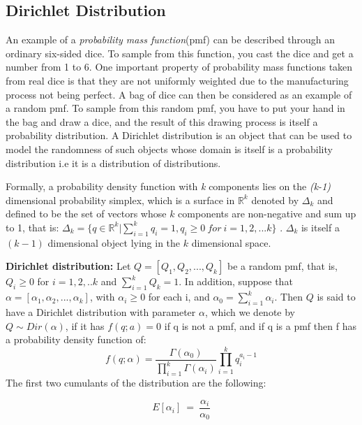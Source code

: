 \documentclass[twoside,hidelinks]{article}
\begin{document}
\subsection{Dirichlet Distribution}

An example of a \textit{probability mass function}(pmf) can be described through an ordinary six-sided dice. To sample from this function, you cast the dice and get a number from 1 to 6. One important property of probability mass functions taken from real dice is that they are not uniformly weighted due to the manufacturing process not being perfect. A bag of dice can then be considered as an example of a random pmf. To sample from this random pmf, you have to put your hand in the bag and draw a dice, and the result of this drawing process is itself a probability distribution. A Dirichlet distribution is an object that can be used to model the randomness of such objects whose domain is itself is a probability distribution i.e it is a distribution of distributions.

Formally, a probability density function with \textit{k} components lies on the \textit{(k-1)} dimensional probability simplex, which is a surface in $ \mathbb{R}^k $ denoted by $ \Delta_k $ and defined to be the set of vectors whose $ k $  components are non-negative and sum up to 1, that is:  $ \Delta_k = \{ q \in  \mathbb{R}^k | \sum_{i=1}^k q_i=1, q_i \geq 0\ for\ i=1,2,...k \} $ . $ \Delta_k $  is itself a $ ( k-1 ) $ dimensional object lying in the $k$ dimensional space. 

\textbf{Dirichlet distribution:} Let $ Q = [Q_1,Q_2,...,Q_k  ] $ be a random pmf, that is, $ Q_i \geq 0 $ for $ i=1,2,..k $ and $ \sum_{i=1}^k Q_k=1 $. In addition, suppose that $ \alpha = [\alpha_1, \alpha_2, ..., \alpha_k ] $, with $ \alpha_i  \ge  0 $ for each i, and $ \alpha_0 = \sum_{i=1}^k \alpha_i $. Then $ Q $ is said to have a Dirichlet distribution with parameter $\alpha$, which we denote by $ Q \sim  Dir(\alpha)$, if it has $f(q;a) = 0$ if q is not a pmf, and if q is a pmf then f has a probability density function of:
\begin{equation}
 f(q; \alpha) = \frac{ \Gamma( \alpha_0)  }{ \prod_{i=1}^{k} \Gamma ( \alpha_i) } \prod_{i=1}^{k} q_i^{a_i -1}
\end{equation}
The first two cumulants of the distribution are the following:

\begin{equation}
 E[ \alpha_i]\ =\ \frac{ \alpha_i }{ \alpha_0 } 
\end{equation}
\end{document}
